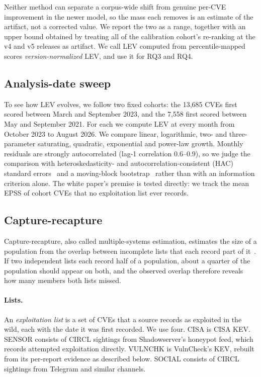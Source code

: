 Neither method can separate a corpus-wide shift from genuine per-CVE
improvement in the newer model, so the mass each removes is an estimate of the
artifact, not a corrected value. We report the two as a range, together with an
upper bound obtained by treating all of the calibration cohort's re-ranking at
the v4 and v5 releases as artifact. We call LEV computed from percentile-mapped scores
\emph{version-normalized} LEV, and use it for RQ3 and RQ4.

\subsection{Analysis-date sweep}\label{sec:m-sweep}

To see how LEV evolves, we follow two fixed cohorts: the 13,685 CVEs first
scored between March and September 2023, and the 7,558 first scored between
May and September 2021. For each we compute LEV at every month from October
2023 to August 2026. We compare linear, logarithmic, two- and three-parameter
saturating, quadratic, exponential and power-law growth. Monthly residuals are
strongly autocorrelated (lag-1 correlation 0.6--0.9), so we judge the comparison
with heteroskedasticity- and autocorrelation-consistent (HAC) standard
errors~\cite{newey1987hac} and a moving-block
bootstrap~\cite{kunsch1989bootstrap} rather than with an information criterion
alone.
The white paper's premise is tested directly: we track the mean EPSS of cohort
CVEs that no exploitation list ever records.

\subsection{Capture-recapture}\label{sec:m-cr}

Capture-recapture, also called multiple-systems estimation, estimates the size
of a population from the overlap between incomplete lists that each record part
of it~\cite{iwgdmf1995,bird2018mse}. If two independent lists each record half
of a population, about a quarter of the population should appear on both, and
the observed overlap therefore reveals how many members both lists missed.

\paragraph{Lists.} An \emph{exploitation list} is a set of CVEs that a source
records as exploited in the wild, each with the date it was first recorded. We
use four. CISA is CISA KEV. SENSOR consists of CIRCL sightings from
Shadowserver's honeypot feed, which records attempted exploitation directly.
VULNCHK is VulnCheck's KEV, rebuilt from its per-report evidence as described
below. SOCIAL consists of CIRCL sightings from Telegram and similar channels.


